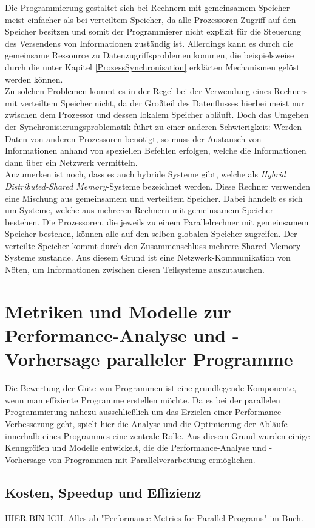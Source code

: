 				Die Programmierung gestaltet sich bei Rechnern mit gemeinsamem Speicher meist einfacher als bei verteiltem Speicher, da alle Prozessoren Zugriff auf den Speicher besitzen und somit der Programmierer nicht explizit für die Steuerung des Versendens von Informationen zuständig ist. Allerdings kann es durch die gemeinsame Ressource zu Datenzugriffsproblemen kommen, die beispielsweise durch die unter Kapitel \ref{ProzessSynchronisation} erklärten Mechanismen gelöst werden können.\\
				Zu solchen Problemen kommt es in der Regel bei der Verwendung eines Rechners mit verteiltem Speicher nicht, da der Großteil des Datenflusses hierbei meist nur zwischen dem Prozessor und dessen lokalem Speicher abläuft. Doch das Umgehen der Synchronisierungsproblematik führt zu einer anderen Schwierigkeit: Werden Daten von anderen Prozessoren benötigt, so muss der Austausch von Informationen anhand von speziellen Befehlen erfolgen, welche die Informationen dann über ein Netzwerk vermitteln. \cite{ParalleleNumerischeVerfahren}\\
				Anzumerken ist noch, dass es auch hybride Systeme gibt, welche als \textit{Hybrid Distributed-Shared Memory}-Systeme bezeichnet werden. Diese Rechner verwenden eine Mischung aus gemeinsamem und verteiltem Speicher. Dabei handelt es sich um Systeme, welche aus mehreren Rechnern mit gemeinsamem Speicher bestehen. Die Prozessoren, die jeweils zu einem Parallelrechner mit gemeinsamem Speicher bestehen, können alle auf den selben globalen Speicher zugreifen. Der verteilte Speicher kommt durch den Zusammenschluss mehrere Shared-Memory-Systeme zustande. Aus diesem Grund ist eine Netzwerk-Kommunikation von Nöten, um Informationen zwischen diesen Teilsysteme auszutauschen. \cite{EntwicklungParallelerProgramme}
				
	\section{Metriken und Modelle zur Performance-Analyse und -Vorhersage paralleler Programme}
		
		Die Bewertung der Güte von Programmen ist eine grundlegende Komponente, wenn man effiziente Programme erstellen möchte. Da es bei der parallelen Programmierung nahezu ausschließlich um das Erzielen einer Performance-Verbesserung geht, spielt hier die Analyse und die Optimierung der Abläufe innerhalb eines Programmes eine zentrale Rolle. Aus diesem Grund wurden einige Kenngrößen und Modelle entwickelt, die die Performance-Analyse und -Vorhersage von Programmen mit Parallelverarbeitung ermöglichen.\\
		
		\subsection{Kosten, Speedup und Effizienz}
		
			HIER BIN ICH.
			Alles ab "Performance Metrics for Parallel Programs" im Buch.